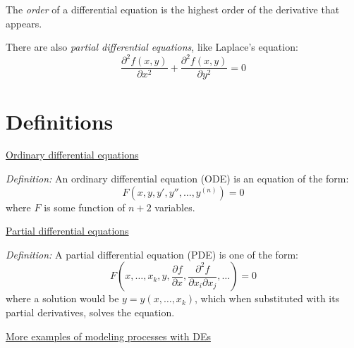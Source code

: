 \documentclass{article}
\newcommand{\tmem}[1]{{\em #1\/}}
\begin{document}
The {\tmem{order}} of a differential equation is the highest order of the
derivative that appears.

There are also {\tmem{partial differential equations}}, like Laplace's
equation:
\[ \frac{\partial^2 f (x, y)}{\partial x^2} + \frac{\partial^2 f (x,
   y)}{\partial y^2} = 0 \]

\section*{Definitions}

{\underline{Ordinary differential equations}}

{\tmem{Definition:}} An ordinary differential equation (ODE) is an equation of
the form:
\[ F (x, y, y', y'', \ldots, y^{(n)}) = 0 \]
where $F$ is some function of $n + 2$ variables.

{\underline{Partial differential equations}}

{\tmem{Definition:}} A partial differential equation (PDE) is one of the form:
\[ F \left( x, \ldots, x_k, y, \frac{\partial f}{\partial x}, \frac{\partial^2
   f}{\partial x_i \partial x_j}, \ldots \right) = 0 \]
where a solution would be $y = y (x, \ldots, x_k)$, which when substituted
with its partial derivatives, solves the equation.

{\underline{More examples of modeling processes with DEs}}
\end{document}

